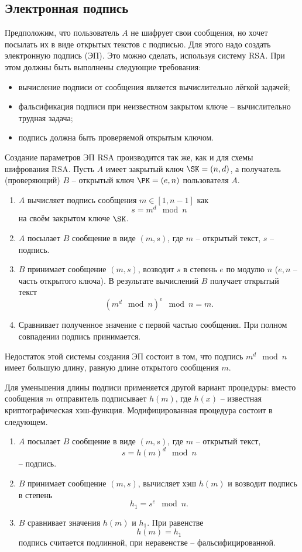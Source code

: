 \subsection{Электронная подпись}

Предположим, что пользователь $A$ не шифрует свои сообщения, но хочет посылать их в виде открытых текстов с подписью. Для этого надо создать электронную подпись (ЭП). Это можно сделать, используя систему RSA. При этом должны быть выполнены следующие требования:
\begin{itemize}
    \item вычисление подписи от сообщения является вычислительно лёгкой задачей;
    \item фальсификация подписи при неизвестном закрытом ключе -- вычислительно трудная задача;
    \item подпись должна быть проверяемой открытым ключом.
\end{itemize}

Создание параметров ЭП RSA производится так же, как и для схемы шифрования RSA. Пусть $A$ имеет закрытый ключ $\SK = (n, d)$, а получатель (проверяющий) $B$ -- открытый ключ $\PK = (e,n)$ пользователя $A$.

\begin{enumerate}
    \item $A$ вычисляет подпись сообщения $m \in [1,n-1]$ как
        \[ s = m^{d} \mod n \]
        на своём закрытом ключе $\SK$.
    \item $A$ посылает $B$ сообщение в виде $(m, s)$, где $m$ -- открытый текст, $s$ -- подпись.
    \item $B$ принимает сообщение $(m, s)$, возводит $s$ в степень $e$ по модулю $n$ ($e, n$ -- часть открытого ключа). В результате вычислений $B$ получает открытый текст
        \[ \left( m^{d} \mod n \right)^{e} \mod n = m. \]
    \item Сравнивает полученное значение с первой частью сообщения. При полном совпадении подпись принимается.
\end{enumerate}
Недостаток этой системы создания ЭП состоит в том, что подпись $m^{d} \mod n$ имеет большую длину, равную длине открытого сообщения $m$.

Для уменьшения длины подписи применяется другой вариант процедуры: вместо сообщения $m$ отправитель подписывает $h(m)$, где $h(x)$ -- известная криптографическая хэш-функция. Модифицированная процедура состоит в следующем.

\begin{enumerate}
    \item $A$ посылает $B$ сообщение в виде $(m, s)$, где $m$ -- открытый текст,
        \[ s = h(m)^d \mod n \]
        -- подпись.
    \item $B$ принимает сообщение $(m, s)$, вычисляет хэш $h(m)$ и возводит подпись в степень
        \[ h_1 = s^e \mod n. \]
    \item $B$ сравнивает значения $h(m)$ и $h_1$. При равенстве
        \[ h(m) = h_1 \]
        подпись считается подлинной, при неравенстве -- фальсифицированной.
\end{enumerate}


